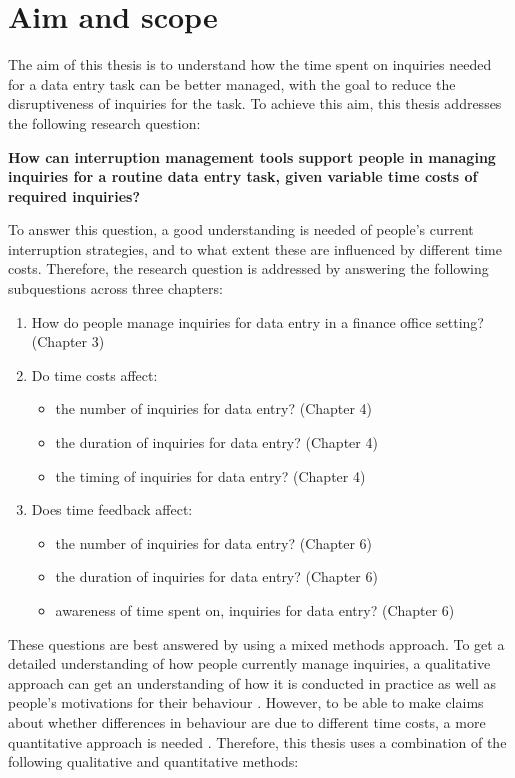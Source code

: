 \section{Aim and scope}
The aim of this thesis is to understand how the time spent on inquiries needed for a data entry task can be better managed, with the goal to reduce the disruptiveness of inquiries for the task. To achieve this aim, this thesis addresses the following research question:

\textbf{How can interruption management tools support people in managing inquiries for a routine data entry task, given variable time costs of required inquiries?}

To answer this question, a good understanding is needed of people's current interruption strategies, and to what extent these are influenced by different time costs. Therefore, the research question is addressed by answering the following subquestions across three chapters:

\begin{enumerate}
\item How do people manage inquiries for data entry in a finance office setting? (Chapter 3)
\item Do time costs affect:
\begin{itemize}
\item the number of inquiries for data entry? (Chapter 4)
\item the duration of inquiries for data entry? (Chapter 4)
\item the timing of inquiries for data entry?  (Chapter 4)
\end{itemize}
\item Does time feedback affect:
\begin{itemize}
\item the number of inquiries for data entry? (Chapter 6)
\item the duration of inquiries for data entry? (Chapter 6)
\item awareness of time spent on, inquiries for data entry? (Chapter 6)
\end{itemize}
\end{enumerate}

These questions are best answered by using a mixed methods approach. To get a detailed understanding of how people currently manage inquiries, a qualitative approach can get an understanding of how it is conducted in practice as well as people's motivations for their behaviour \citep{Blandford2016}. However, to be able to make claims about whether differences in behaviour are due to different time costs, a more quantitative approach is needed \citep{Cairns2008}.  
Therefore, this thesis uses a combination of the following qualitative and quantitative methods:

